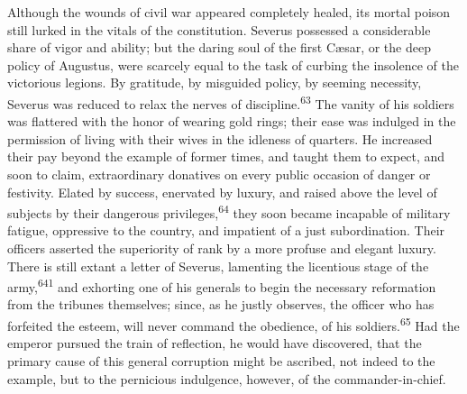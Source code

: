 

Although the wounds of civil war appeared completely healed, its
mortal poison still lurked in the vitals of the constitution.
Severus possessed a considerable share of vigor and ability; but
the daring soul of the first Cæsar, or the deep policy of
Augustus, were scarcely equal to the task of curbing the
insolence of the victorious legions. By gratitude, by misguided
policy, by seeming necessity, Severus was reduced to relax the
nerves of discipline.\textsuperscript{63} The vanity of his soldiers was flattered
with the honor of wearing gold rings; their ease was indulged in
the permission of living with their wives in the idleness of
quarters. He increased their pay beyond the example of former
times, and taught them to expect, and soon to claim,
extraordinary donatives on every public occasion of danger or
festivity. Elated by success, enervated by luxury, and raised
above the level of subjects by their dangerous privileges,\textsuperscript{64}
they soon became incapable of military fatigue, oppressive to the
country, and impatient of a just subordination. Their officers
asserted the superiority of rank by a more profuse and elegant
luxury. There is still extant a letter of Severus, lamenting the
licentious stage of the army,\textsuperscript{641} and exhorting one of his
generals to begin the necessary reformation from the tribunes
themselves; since, as he justly observes, the officer who has
forfeited the esteem, will never command the obedience, of his
soldiers.\textsuperscript{65} Had the emperor pursued the train of reflection, he
would have discovered, that the primary cause of this general
corruption might be ascribed, not indeed to the example, but to
the pernicious indulgence, however, of the commander-in-chief.




